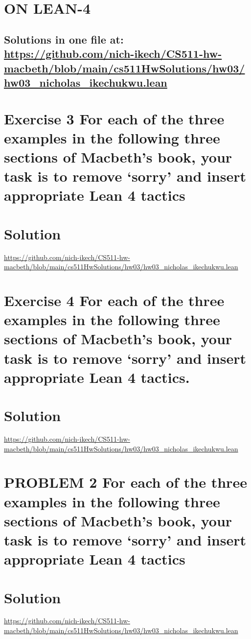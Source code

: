 \documentclass{article}
\begin{document}
\section*{ON LEAN-4}
\subsection*{Solutions in one file at: 
\url{https://github.com/nich-ikech/CS511-hw-macbeth/blob/main/cs511HwSolutions/hw03/hw03_nicholas_ikechukwu.lean}}

\newpage

\section*{Exercise 3 For each of the three examples in the following three sections of Macbeth’s book, your
task is to remove ‘sorry’ and insert appropriate Lean 4 tactics}
\section*{Solution}
\url{https://github.com/nich-ikech/CS511-hw-macbeth/blob/main/cs511HwSolutions/hw03/hw03_nicholas_ikechukwu.lean}

\newpage

\section*{Exercise 4 For each of the three examples in the following three sections of Macbeth’s book, your
task is to remove ‘sorry’ and insert appropriate Lean 4 tactics.}
\section*{Solution}

\url{https://github.com/nich-ikech/CS511-hw-macbeth/blob/main/cs511HwSolutions/hw03/hw03_nicholas_ikechukwu.lean}

\newpage

\section*{PROBLEM 2 For each of the three examples in the following three sections of Macbeth’s book,
your task is to remove ‘sorry’ and insert appropriate Lean 4 tactics}
\section*{Solution}

\url{https://github.com/nich-ikech/CS511-hw-macbeth/blob/main/cs511HwSolutions/hw03/hw03_nicholas_ikechukwu.lean}
\end{document}
